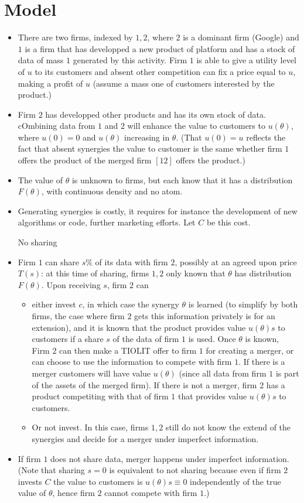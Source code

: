 \documentclass[a4paper,leqno]{article}%
\renewcommand{\t}{\theta}
\begin{document}
\section{Model}
\begin{itemize}
    \item There are two firms, indexed by $1,2$, where $2$ is a dominant firm (Google) and $1$ is a firm that has developped a new product of platform and has a stock of data of mass $1$ generated by this activity. Firm $1$ is able to give a utility level of $u$ to its customers and absent other competition can fix a price equal to $u$, making a profit of $u$ (assume a mass one of customers interested by the product.)
    \item Firm $2$ has developped other products and has its own stock of data. cOmbining data from $1$ and $2$ will enhance the value to customers to $u(\t)$, where $u(0)=0$ and $u(\t)$ increasing in $\t$. (That $u(0)=u$ reflects the fact that absent synergies the value to customer is the same whether firm $1$ offers the product of the merged firm $[12]$ offers the product.)
    \item The value of $\t$ is unknown to firms, but each know that it has a distribution $F(\t)$, with continuous density and no atom.
    \item Generating synergies is costly, it requires for instance the development of new algorithms or code, further marketing efforts. Let $C$ be this cost.
    \item [No sharing]
    \item Firm $1$ can share $s\%$ of its data with firm $2$, possibly at an agreed upon price $T(s)$: at this time of sharing, firms $1,2$ only known that $\t$ has distribution $F(\t)$. Upon receiving $s$, firm $2$ can 
    \begin{itemize}
        \item either invest $c$, in which case the synergy $\t$ is learned (to simplify by both firms, the case where firm $2$ gets this information privately is for an extension), and it is known that the product provides value $u(\t)s$ to customers if a share $s$ of the data of firm $1$ is used. Once $\t$ is known, Firm 2 can then make a TIOLIT offer to firm $1$ for creating a merger, or can choose to use the information to compete with firm $1$. If there is a merger customers will have value $u(\t)$ (since all data from firm $1$ is part of the assets of the merged firm). If there is not a merger, firm $2$ has a product competiting with that of firm $1$ that provides value $u(\t)s$ to customers.
        \item Or not invest. In this case, firms $1,2$ still do not know the extend of the synergies and decide for a merger under imperfect information.
    \end{itemize}
    \item If firm $1$ does not share data, merger happens under imperfect information. (Note that sharing $s=0$ is equivalent to not sharing because even if firm $2$ invests $C$ the value to customers is $u(\t)s\equiv 0$ independently of the true value of $\t$, hence firm $2$ cannot compete with firm $1$.)
\end{itemize}
\end{document}
